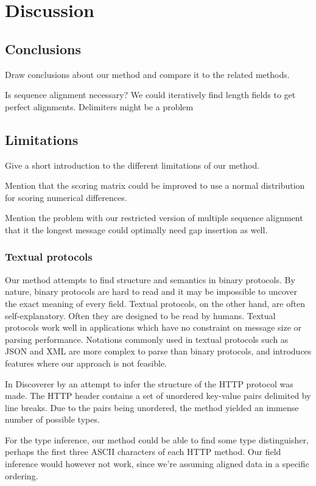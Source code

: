 \documentclass[a4paper]{report}
\begin{document}
\chapter{Discussion}

\section{Conclusions}
Draw conclusions about our method and compare it to the related methods.

Is sequence alignment necessary? We could iteratively find length fields to get
perfect alignments. Delimiters might be a problem

\section{Limitations}
Give a short introduction to the different limitations of our method.

Mention that the scoring matrix could be improved to use a normal distribution
for scoring numerical differences.

Mention the problem with our restricted version of multiple sequence alignment
that it the longest message could optimally need gap insertion as well.

\subsection{Textual protocols}
Our method attempts to find structure and semantics in binary protocols.
By nature, binary protocols are hard to read and it may be impossible to
uncover the exact meaning of every field. Textual protocols, on the other
hand, are often self-explanatory. Often they are designed to be read by
humans. Textual protocols work well in applications which have no constraint
on message size or parsing performance. Notations commonly used in textual
protocols such as JSON and XML are more complex to parse than binary protocols,
and introduces features where our approach is not feasible.

In Discoverer by \citeauthor{cui07} an attempt to infer the structure of
the HTTP protocol was made. The HTTP header contains a set of unordered
key-value pairs delimited by line breaks. Due to the pairs being unordered,
the method yielded an immense number of possible types.

For the type inference, our method could be able to find some type 
distinguisher, perhaps the first three ASCII characters of each HTTP method.
Our field inference would however not work, since we're assuming aligned
data in a specific ordering.
\end{document}
